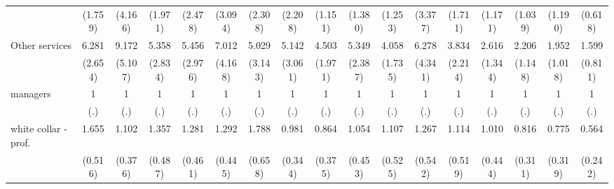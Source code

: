 {\begin{tabular}{l*{16}{c}}
                    &     (1.759)         &     (4.166)         &     (1.971)         &     (2.478)         &     (3.094)         &     (2.308)         &     (2.208)         &     (1.151)         &     (1.380)         &     (1.253)         &     (3.377)         &     (1.711)         &     (1.171)         &     (1.039)         &     (1.190)         &     (0.618)         \\
[1em]
Other services      &       6.281\sym{***}&       9.172\sym{***}&       5.358\sym{**} &       5.456\sym{**} &       7.012\sym{**} &       5.029\sym{**} &       5.142\sym{**} &       4.503\sym{***}&       5.349\sym{***}&       4.058\sym{**} &       6.278\sym{**} &       3.834\sym{*}  &       2.616         &       2.206         &       1.952         &       1.599         \\
                    &     (2.654)         &     (5.107)         &     (2.834)         &     (2.976)         &     (4.168)         &     (3.143)         &     (3.061)         &     (1.971)         &     (2.387)         &     (1.735)         &     (4.341)         &     (2.214)         &     (1.344)         &     (1.148)         &     (1.018)         &     (0.811)         \\
[1em]
managers            &           1         &           1         &           1         &           1         &           1         &           1         &           1         &           1         &           1         &           1         &           1         &           1         &           1         &           1         &           1         &           1         \\
                    &         (.)         &         (.)         &         (.)         &         (.)         &         (.)         &         (.)         &         (.)         &         (.)         &         (.)         &         (.)         &         (.)         &         (.)         &         (.)         &         (.)         &         (.)         &         (.)         \\
[1em]
white collar - prof.&       1.655         &       1.102         &       1.357         &       1.281         &       1.292         &       1.788         &       0.981         &       0.864         &       1.054         &       1.107         &       1.267         &       1.114         &       1.010         &       0.816         &       0.775         &       0.564         \\
                    &     (0.516)         &     (0.376)         &     (0.487)         &     (0.461)         &     (0.445)         &     (0.658)         &     (0.344)         &     (0.375)         &     (0.453)         &     (0.525)         &     (0.542)         &     (0.519)         &     (0.444)         &     (0.311)         &     (0.319)         &     (0.242)         \\

\end{tabular}}

